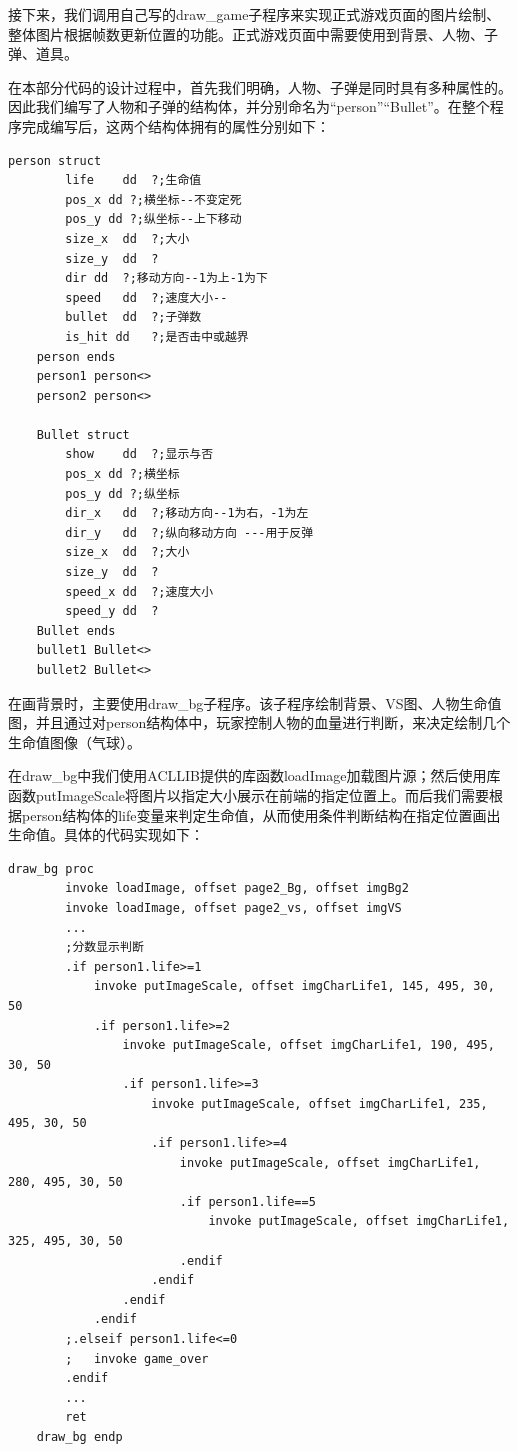 \par
接下来，我们调用自己写的draw\_game子程序来实现正式游戏页面的图片绘制、整体图片根据帧数更新位置的功能。正式游戏页面中需要使用到背景、人物、子弹、道具。
\par
在本部分代码的设计过程中，首先我们明确，人物、子弹是同时具有多种属性的。因此我们编写了人物和子弹的结构体，并分别命名为“person”“Bullet”。在整个程序完成编写后，这两个结构体拥有的属性分别如下：
\begin{lstlisting}[language={[x86masm]Assembler}]
    person struct
        life	dd	?;生命值
        pos_x dd ?;横坐标--不变定死
        pos_y dd ?;纵坐标--上下移动
        size_x	dd	?;大小
        size_y	dd	?
        dir	dd	?;移动方向--1为上-1为下
        speed	dd	?;速度大小--
        bullet	dd	?;子弹数
        is_hit dd	?;是否击中或越界
    person ends
    person1 person<>
    person2	person<>

    Bullet struct
        show	dd	?;显示与否
        pos_x dd ?;横坐标
        pos_y dd ?;纵坐标
        dir_x	dd	?;移动方向--1为右，-1为左
        dir_y	dd	?;纵向移动方向 ---用于反弹
        size_x	dd	?;大小
        size_y	dd	?
        speed_x	dd	?;速度大小
        speed_y	dd	?
    Bullet ends
    bullet1 Bullet<>
    bullet2	Bullet<>
\end{lstlisting}
\par
在画背景时，主要使用draw\_bg子程序。该子程序绘制背景、VS图、人物生命值图，并且通过对person结构体中，玩家控制人物的血量进行判断，来决定绘制几个生命值图像（气球）。
\par
在draw\_bg中我们使用ACLLIB提供的库函数loadImage加载图片源；然后使用库函数putImageScale将图片以指定大小展示在前端的指定位置上。而后我们需要根据person结构体的life变量来判定生命值，从而使用条件判断结构在指定位置画出生命值。具体的代码实现如下：
\begin{lstlisting}[language={[x86masm]Assembler}]
    draw_bg proc
        invoke loadImage, offset page2_Bg, offset imgBg2
        invoke loadImage, offset page2_vs, offset imgVS
        ...
        ;分数显示判断
        .if person1.life>=1
            invoke putImageScale, offset imgCharLife1, 145, 495, 30, 50
            .if person1.life>=2
                invoke putImageScale, offset imgCharLife1, 190, 495, 30, 50
                .if person1.life>=3
                    invoke putImageScale, offset imgCharLife1, 235, 495, 30, 50
                    .if person1.life>=4
                        invoke putImageScale, offset imgCharLife1, 280, 495, 30, 50
                        .if person1.life==5
                            invoke putImageScale, offset imgCharLife1, 325, 495, 30, 50
                        .endif
                    .endif
                .endif
            .endif
        ;.elseif person1.life<=0
        ;	invoke game_over
        .endif
        ...
        ret
    draw_bg endp
\end{lstlisting}
